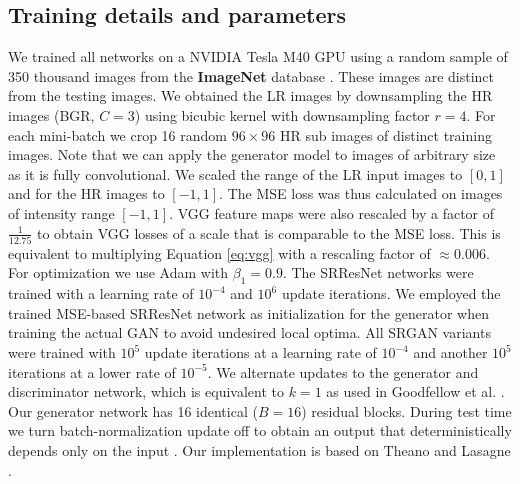\documentclass[10pt,twocolumn,letterpaper]{article}
\begin{document}
\subsection{Training details and parameters}
We trained all networks on a NVIDIA Tesla M40 GPU using a random sample of 350 thousand images from the \textbf{ImageNet} database \cite{russakovsky2014imagenet}. These images are distinct from the testing images. We obtained the \ac{LR} images by downsampling the \ac{HR} images (BGR, $C=3$) using bicubic kernel with downsampling factor $r=4$. For each mini-batch we crop 16 random $96\times96$ \ac{HR} sub images of distinct training images. Note that we can apply the generator model to images of arbitrary size as it is fully convolutional.
We scaled the range of the \ac{LR} input images to $[0, 1]$ and for the \ac{HR} images to $[-1, 1]$. The \ac{MSE} loss was thus calculated on images of intensity range $[-1, 1]$. VGG feature maps were also rescaled by a factor of $\frac{1}{12.75}$ to obtain VGG losses of a scale that is comparable to the \ac{MSE} loss. This is equivalent to multiplying Equation \ref{eq:vgg} with a rescaling factor of $\approx0.006$.
For optimization we use Adam \cite{Kingma2014} with $\beta_1=0.9$. The SRResNet networks were trained with a learning rate of $10^{-4}$ and $10^{6}$ update iterations. We employed the trained \ac{MSE}-based SRResNet network as initialization for the generator when training the actual \ac{GAN} to avoid undesired local optima.
All SRGAN variants were trained with $10^5$ update iterations at a learning rate of $10^{-4}$ and another $10^5$ iterations at a lower rate of $10^{-5}$.
We alternate updates to the generator and discriminator network, which is equivalent to $k=1$ as used in Goodfellow et al. \cite{Goodfellow14GAN}. Our generator network has 16 identical ($B=16$) residual blocks. During test time we turn batch-normalization update off to obtain an output that deterministically depends only on the input \cite{Ioffe2015}. Our implementation is based on Theano \cite{theano2016} and Lasagne \cite{lasagne2015}.
\end{document}
